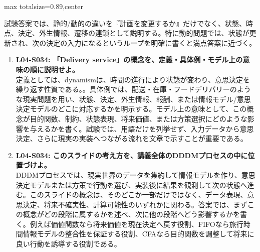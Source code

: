 \begin{minipage}[t]{0.58\textwidth}
\begin{adjustbox}{max totalsize={\textwidth}{0.89\textheight},center}
\begin{minipage}{\textwidth}
試験答案では、静的/動的の違いを『計画を変更するか』だけでなく、状態、時点、決定、外生情報、遷移の連鎖として説明する。特に動的問題では、状態が更新され、次の決定の入力になるというループを明確に書くと満点答案に近づく。\par{}\begin{enumerate}\item \textbf{L04-S034: 「Delivery service」の概念を、定義・具体例・モデル上の意味の順に説明せよ。}\\定義としては、dynamismは、時間の進行により状態が変わり、意思決定を繰り返す性質である。。具体例では、配送・在庫・フードデリバリーのような現実問題を用い、状態、決定、外生情報、報酬、または情報モデル/意思決定モデルのどこに対応するかを明示する。モデル上の意味として、この概念が目的関数、制約、状態表現、将来価値、または方策選択にどのような影響を与えるかを書く。試験では、用語だけを列挙せず、入力データから意思決定、さらに現実の実装へつながる流れを文章で示すことが重要である。\item \textbf{L04-S034: このスライドの考え方を、講義全体のDDDMプロセスの中に位置づけよ。}\\DDDMプロセスでは、現実世界のデータを集約して情報モデルを作り、意思決定モデルまたは方策で行動を選び、実装後に結果を観測して次の状態へ進む。このスライドの概念は、そのどこか一部だけではなく、データ表現、意思決定、将来不確実性、計算可能性のいずれかに関わる。答案では、まずこの概念がどの段階に属するかを述べ、次に他の段階へどう影響するかを書く。例えば価値関数なら将来価値を現在決定へ戻す役割、FIFOなら旅行時間情報モデルの整合性を保証する役割、CFAなら目的関数を調整して将来に良い行動を誘導する役割である。\end{enumerate}
\end{minipage}
\end{adjustbox}
\end{minipage}


